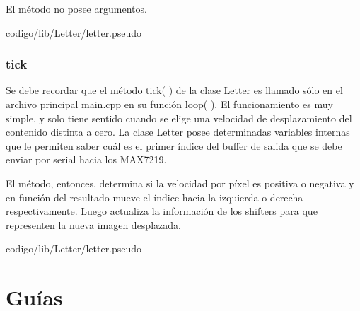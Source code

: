         El método no posee argumentos.
        
        
                     {codigo/lib/Letter/letter.pseudo}
                     
                     
        \subsubsection{tick}
        Se debe recordar que el método tick( ) de la clase Letter es llamado sólo en el archivo principal main.cpp en su función loop( ). El funcionamiento es muy simple, y solo tiene sentido cuando se elige una velocidad de desplazamiento del contenido distinta a cero. La clase Letter posee determinadas variables internas que le permiten saber cuál es el primer índice del buffer de salida que se debe enviar por serial hacia los MAX7219.

        El método, entonces, determina si la velocidad por píxel es positiva o negativa y en función del resultado mueve el índice hacia la izquierda o derecha respectivamente. Luego actualiza la información de los shifters para que representen la nueva imagen desplazada.

        
                     {codigo/lib/Letter/letter.pseudo}


\clearpage


\section{Guías}
    

